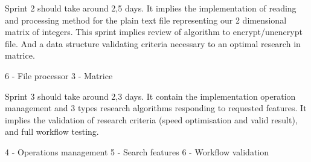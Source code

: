 Sprint 2 should take around 2,5 days. It implies the implementation of reading and processing method for
the plain text file representing our 2 dimensional matrix of integers.
This sprint implies review of algorithm to encrypt/unencrypt file.
And a data structure validating criteria necessary to an optimal research in matrice.

    6 - File processor
    3 - Matrice

Sprint 3 should take around 2,3 days.
It contain the implementation operation management and 3 types research algorithms responding to requested features.
It implies the validation of research criteria (speed optimisation and valid result), and full workflow testing.

    4 - Operations management
    5 - Search features
    6 - Workflow validation
